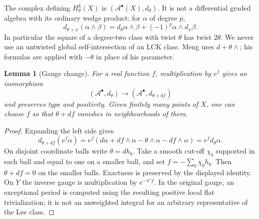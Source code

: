 \documentclass[12pt]{amsart}
\newtheorem{lem}[thm]{Lemma}
\theoremstyle{definition}
\theoremstyle{remark}
\numberwithin{equation}{section}
\newcommand{\cA}{\mathcal{A}}
\begin{document}
The complex defining $H^k_\theta(X)$ is $(\cA^\bullet(X),d_\theta)$. It is not a differential graded algebra with its ordinary wedge product: for $\alpha$ of degree $p$,
\begin{equation}\label{eq:product}
 d_{\theta+\psi}(\alpha\wedge\beta)
 =d_\theta\alpha\wedge\beta+(-1)^p\alpha\wedge d_\psi\beta.
\end{equation}
In particular the square of a degree-two class with twist $\theta$ has twist $2\theta$. We never use an untwisted global self-intersection of an LCK class. Meng uses $d+\theta\wedge$; his formulas are applied with $-\theta$ in place of his parameter.

\begin{lem}[Gauge change]\label{lem:gauge}
For a real function $f$, multiplication by $e^f$ gives an isomorphism
\[
 (\cA^\bullet,d_\theta)\longrightarrow(\cA^\bullet,d_{\theta+df})
\]
and preserves type and positivity. Given finitely many points of $X$, one can choose $f$ so that $\theta+df$ vanishes in neighbourhoods of them.
\end{lem}
\begin{proof}
Expanding the left side gives
\[
 d_{\theta+df}(e^f\alpha)
 =e^f(d\alpha+df\wedge\alpha-\theta\wedge\alpha-df\wedge\alpha)
 =e^fd_\theta\alpha.
\]
On disjoint coordinate balls write $\theta=dh_b$. Take a smooth cut-off $\chi_b$ supported in each ball and equal to one on a smaller ball, and set $f=-\sum_b\chi_bh_b$. Then $\theta+df=0$ on the smaller balls. Exactness is preserved by the displayed identity. On $Y$ the inverse gauge is multiplication by $e^{-\pi^*f}$. In the original gauge, an exceptional period is computed using the resulting positive local flat trivialization; it is not an unweighted integral for an arbitrary representative of the Lee class.
\end{proof}
\end{document}
